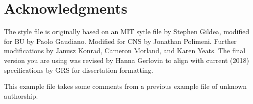 \section*{Acknowledgments}

The style file is originally based on an MIT sytle file by Stephen Gildea, modified for BU by Paolo Gaudiano.  Modified for CNS by Jonathan Polimeni.  Further modifications by Janusz Konrad, Cameron Morland, and Karen Yeats. The final version you are using was revised by Hanna Gerlovin to align with current (2018) specifications by GRS for dissertation formatting.

This example file takes some comments from a previous example file of unknown authorship.